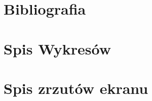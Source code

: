 \documentclass[12pt]{article}
\begin{document}
	{
		\section{Bibliografia}
		\printbibliography[heading=none]
	}

	{
		\section{Spis Wykresów}
		\listoffigures
		\thispagestyle{fancy}
	}

	{

		\section{Spis zrzutów ekranu}
		\listofscreenshots
		\thispagestyle{fancy}
	}
\end{document}
